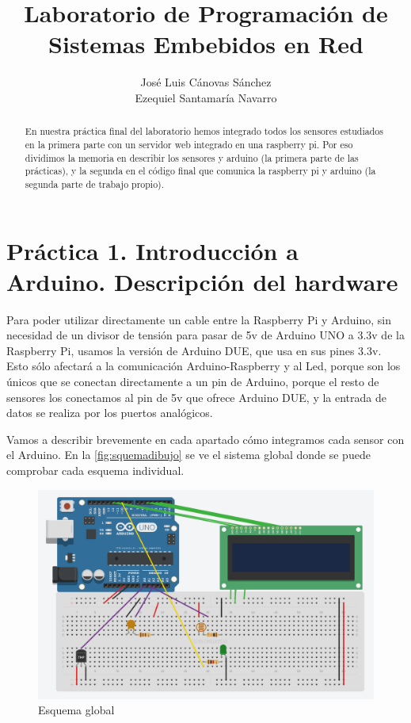 \documentclass[]{article}
\title{Laboratorio de Programación de Sistemas Embebidos en Red}
\author{José Luis Cánovas Sánchez\\Ezequiel Santamaría Navarro}
\begin{document}
\maketitle


\begin{abstract}
En nuestra práctica final del laboratorio hemos integrado todos los sensores estudiados en la primera parte con un servidor web integrado en una raspberry pi. Por eso dividimos la memoria en describir los sensores y arduino (la primera parte de las prácticas), y la segunda en el código final que comunica la raspberry pi y arduino (la segunda parte de trabajo propio).
\end{abstract}

\tableofcontents

\clearpage

\section{Práctica 1. Introducción a Arduino. Descripción del hardware}
Para poder utilizar directamente un cable entre la Raspberry Pi y Arduino, sin necesidad de un divisor de tensión para pasar de 5v de Arduino UNO a 3.3v de la Raspberry Pi, usamos la versión de Arduino DUE, que usa en sus pines 3.3v. Esto sólo afectará a la comunicación Arduino-Raspberry y al Led, porque son los únicos que se conectan directamente a un pin de Arduino, porque el resto de sensores los conectamos al pin de 5v que ofrece Arduino DUE, y la entrada de datos se realiza por los puertos analógicos.

Vamos a describir brevemente en cada apartado cómo integramos cada sensor con el Arduino. En la  \autoref{fig:squemadibujo} se ve el sistema global donde se puede comprobar cada esquema individual.

\begin{figure}[h!]
	\centering
	\includegraphics[width=1\linewidth]{images/squemaDibujo.PNG}
	\caption{Esquema global}
	\label{fig:squemadibujo}
\end{figure}
\end{document}
